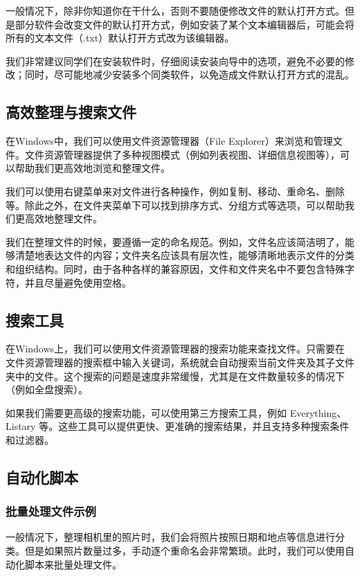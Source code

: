 \documentclass[../main.tex]{subfiles}
\begin{document}
一般情况下，除非你知道你在干什么，否则不要随便修改文件的默认打开方式。但是部分软件会改变文件的默认打开方式，例如安装了某个文本编辑器后，可能会将所有的文本文件（.txt）默认打开方式改为该编辑器。

我们非常建议同学们在安装软件时，仔细阅读安装向导中的选项，避免不必要的修改；同时，尽可能地减少安装多个同类软件，以免造成文件默认打开方式的混乱。

\subsection{高效整理与搜索文件}

在Windows中，我们可以使用文件资源管理器（File Explorer）来浏览和管理文件。文件资源管理器提供了多种视图模式（例如列表视图、详细信息视图等），可以帮助我们更高效地浏览和整理文件。

我们可以使用右键菜单来对文件进行各种操作，例如复制、移动、重命名、删除等。除此之外，在文件夹菜单下可以找到排序方式、分组方式等选项，可以帮助我们更高效地整理文件。

我们在整理文件的时候，要遵循一定的命名规范。例如，文件名应该简洁明了，能够清楚地表达文件的内容；文件夹名应该具有层次性，能够清晰地表示文件的分类和组织结构。同时，由于各种各样的兼容原因，文件和文件夹名中不要包含特殊字符，并且尽量避免使用空格。

\subsection{搜索工具}

在Windows上，我们可以使用文件资源管理器的搜索功能来查找文件。只需要在文件资源管理器的搜索框中输入关键词，系统就会自动搜索当前文件夹及其子文件夹中的文件。这个搜索的问题是速度非常缓慢，尤其是在文件数量较多的情况下（例如全盘搜索）。

如果我们需要更高级的搜索功能，可以使用第三方搜索工具，例如 Everything、Listary 等。这些工具可以提供更快、更准确的搜索结果，并且支持多种搜索条件和过滤器。

\subsection{自动化脚本}

\subsubsection{批量处理文件示例}

一般情况下，整理相机里的照片时，我们会将照片按照日期和地点等信息进行分类。但是如果照片数量过多，手动逐个重命名会非常繁琐。此时，我们可以使用自动化脚本来批量处理文件。
\end{document}
